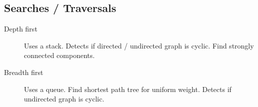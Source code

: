 \documentclass[landscape]{cheat}
\begin{document}
\begin{multicols}{3}
\subsection{Searches / Traversals}
\begin{description}
    \item[Depth first]
        Uses a stack.
        Detects if directed / undirected graph is cyclic.
        Find strongly connected components.
    \item[Breadth first]
        Uses a queue.
        Find shortest path tree for uniform weight.
        Detects if undirected graph is cyclic.
\end{description}

\end{multicols}
\end{document}
